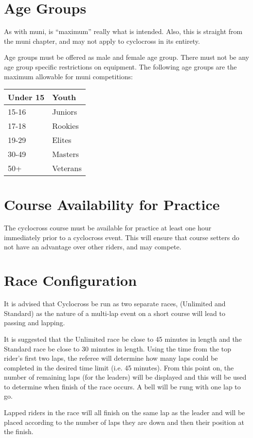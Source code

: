 \section{Age Groups}

\begin{comment-2016}
As with muni, is ``maximum'' really what is intended.  Also, this is straight from the muni chapter, and may not apply to cyclocross in its entirety.
\end{comment-2016}

Age groups must be offered as male and female age group.
There must not be any age group specific restrictions on equipment.
The following age groups are the maximum allowable for muni competitions:

\begin{tabular}{|l|l|}
\hline
Under 15 & Youth \\
\hline
15-16 & Juniors \\
\hline
17-18 & Rookies \\
\hline
19-29 & Elites \\
\hline
30-49 & Masters \\
\hline
50+ & Veterans \\
\hline
\end{tabular}

\section{Course Availability for Practice}

The cyclocross course must be available for practice at least one hour immediately prior to a cyclocross event.
This will ensure that course setters do not have an advantage over other riders, and may compete.

\section{Race Configuration}

It is advised that Cyclocross be run as two separate races, (Unlimited and Standard) as the nature of a multi-lap event on a short course will lead to passing and lapping.

It is suggested that the Unlimited race be close to 45 minutes in length and the Standard race be close to 30 minutes in length.
Using the time from the top rider's first two laps, the referee will determine how many laps could be completed in the desired time limit (i.e. 45 minutes).
From this point on, the number of remaining laps (for the leaders) will be displayed and this will be used to determine when finish of the race occurs.
A bell will be rung with one lap to go.

Lapped riders in the race will all finish on the same lap as the leader and will be placed according to the number of laps they are down and then their position at the finish.
